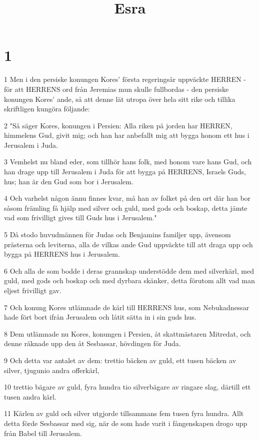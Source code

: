 

\title{Esra}


\chapter{1}

\par 1 Men i den persiske konungen Kores' första regeringsår uppväckte HERREN - för att HERRENS ord från Jeremias mun skulle fullbordas - den persiske konungen Kores' ande, så att denne lät utropa över hela sitt rike och tillika skriftligen kungöra följande:
\par 2 "Så säger Kores, konungen i Persien: Alla riken på jorden har HERREN, himmelens Gud, givit mig; och han har anbefallt mig att bygga honom ett hus i Jerusalem i Juda.
\par 3 Vemhelst nu bland eder, som tillhör hans folk, med honom vare hans Gud, och han drage upp till Jerusalem i Juda för att bygga på HERRENS, Israels Guds, hus; han är den Gud som bor i Jerusalem.
\par 4 Och varhelst någon ännu finnes kvar, må han av folket på den ort där han bor såsom främling få hjälp med silver och guld, med gods och boskap, detta jämte vad som frivilligt gives till Guds hus i Jerusalem."
\par 5 Då stodo huvudmännen för Judas och Benjamins familjer upp, ävensom prästerna och leviterna, alla de vilkas ande Gud uppväckte till att draga upp och bygga på HERRENS hus i Jerusalem.
\par 6 Och alla de som bodde i deras grannskap understödde dem med silverkärl, med guld, med gods och boskap och med dyrbara skänker, detta förutom allt vad man eljest frivilligt gav.
\par 7 Och konung Kores utlämnade de kärl till HERRENS hus, som Nebukadnessar hade fört bort ifrån Jerusalem och låtit sätta in i sin guds hus.
\par 8 Dem utlämnade nu Kores, konungen i Persien, åt skattmästaren Mitredat, och denne räknade upp den åt Sesbassar, hövdingen för Juda.
\par 9 Och detta var antalet av dem: trettio bäcken av guld, ett tusen bäcken av silver, tjugunio andra offerkärl,
\par 10 trettio bägare av guld, fyra hundra tio silverbägare av ringare slag, därtill ett tusen andra kärl.
\par 11 Kärlen av guld och silver utgjorde tillsammans fem tusen fyra hundra. Allt detta förde Sesbassar med sig, när de som hade varit i fångenskapen drogo upp från Babel till Jerusalem.


